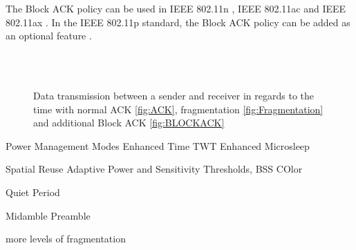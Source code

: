 The Block \ac{ACK} policy can be used in IEEE 802.11n \cite{noauthor_ieee_2021-1}, IEEE 802.11ac \cite{noauthor_ieee_2021-1} and IEEE 802.11ax \cite{noauthor_ieee_2021}.
In the IEEE 802.11p standard, the Block \ac{ACK} policy can be added as an optional feature \cite{noauthor_ieee_2021-1}.

\begin{figure}%
    \centering
    \\
    \\
    \caption{Data transmission between a sender and receiver in regards to the time with normal \acf{ACK} \autoref{fig:ACK},
    fragmentation \autoref{fig:Fragmentation} and additional Block \ac{ACK} \autoref{fig:BLOCKACK}}%
    \label{fig:ACKS}%
\end{figure}

\cite{khorov_tutorial_2019}
Power Management Modes
Enhanced Time TWT Enhanced Microsleep

Spatial Reuse
Adaptive Power and Sensitivity Thresholds, BSS COlor

Quiet Period

Midamble Preamble


more levels of fragmentation
